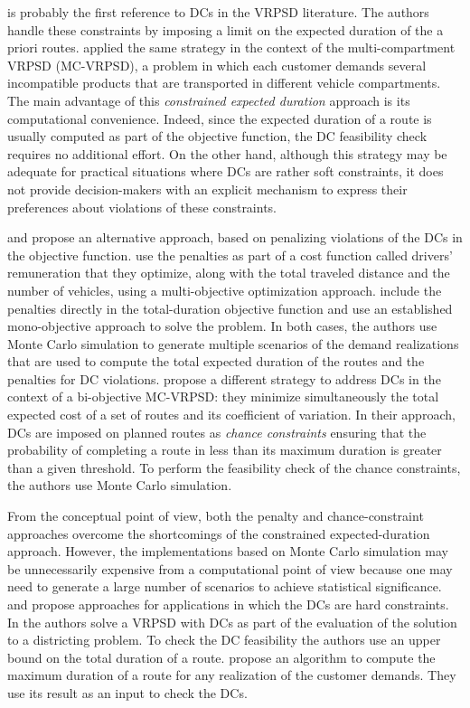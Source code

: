 \citet{Yang2000} is probably the first reference to DCs in the VRPSD literature. The authors handle these constraints by imposing a limit on the expected duration of the a priori routes. \citet{Mendoza2010,Mendoza2011} applied the same strategy in the context of the multi-compartment VRPSD (MC-VRPSD), a problem in which each customer demands several incompatible products that are transported in different vehicle compartments. The main advantage of this \emph{constrained expected duration} approach is its computational convenience. Indeed, since the expected duration of a route is usually computed as part of the objective function, the DC feasibility check requires no additional effort. On the other hand, although this strategy may be adequate for practical situations where DCs are rather soft constraints, it does not provide decision-makers with an explicit mechanism to express their preferences about violations of these constraints.

\citet{Tan2007} and \cite{Sorensen2009} propose an alternative approach, based on penalizing violations of the DCs in the objective function. \citet{Tan2007} use the penalties as part of a cost function called drivers' remuneration that they optimize, along with the total traveled distance and the number of vehicles, using a multi-objective optimization approach. \cite{Sorensen2009} include the penalties directly in the total-duration objective function and use an established mono-objective approach \citep{Sorensen2006a} to solve the problem. In both cases, the authors use Monte Carlo simulation to generate multiple scenarios of the demand realizations that are used to compute the total expected duration of the routes and the penalties for DC violations. \cite{Mendoza2009b} propose a different strategy to address DCs in the context of a bi-objective MC-VRPSD: they minimize simultaneously the total expected cost of a set of routes and its coefficient of variation. In their approach, DCs are imposed on planned routes as \emph{chance constraints} ensuring that the probability of completing a route in less than its maximum duration is greater than a given threshold. To perform the feasibility check of the chance constraints, the authors use Monte Carlo simulation.

From the conceptual point of view, both the penalty and chance-constraint approaches overcome the shortcomings of the constrained expected-duration approach. However, the implementations based on Monte Carlo simulation may be unnecessarily expensive from a computational point of view because one may need to generate a large number of scenarios to achieve statistical significance. \citet{Haugland2007} and \citet{Erera2010} propose approaches for applications in which the DCs are hard constraints. In \cite{Haugland2007} the authors solve a VRPSD with DCs as part of the evaluation of the solution to a districting problem. To check the DC feasibility the authors use an upper bound on the total duration of a route. \citet{Erera2010} propose an algorithm to compute the maximum duration of a route for any realization of the customer demands. They use its result as an input to check the DCs.

